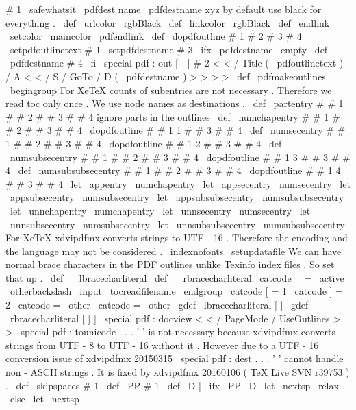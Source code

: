 {{{{
#
1
}
%
\
safewhatsit
{
\
pdfdest
name
{
\
pdfdestname
}
xyz
}
%
}
%
%
by
default
use
black
for
everything
.
\
def
\
urlcolor
{
\
rgbBlack
}
\
def
\
linkcolor
{
\
rgbBlack
}
\
def
\
endlink
{
\
setcolor
{
\
maincolor
}
\
pdfendlink
}
%
\
def
\
dopdfoutline
#
1
#
2
#
3
#
4
{
%
\
setpdfoutlinetext
{
#
1
}
\
setpdfdestname
{
#
3
}
\
ifx
\
pdfdestname
\
empty
\
def
\
pdfdestname
{
#
4
}
%
\
fi
%
\
special
{
pdf
:
out
[
-
]
#
2
<
<
/
Title
(
\
pdfoutlinetext
)
/
A
<
<
/
S
/
GoTo
/
D
(
\
pdfdestname
)
>
>
>
>
}
%
}
%
\
def
\
pdfmakeoutlines
{
%
\
begingroup
%
%
For
XeTeX
counts
of
subentries
are
not
necessary
.
%
Therefore
we
read
toc
only
once
.
%
%
We
use
node
names
as
destinations
.
\
def
\
partentry
#
#
1
#
#
2
#
#
3
#
#
4
{
}
%
ignore
parts
in
the
outlines
\
def
\
numchapentry
#
#
1
#
#
2
#
#
3
#
#
4
{
%
\
dopdfoutline
{
#
#
1
}
{
1
}
{
#
#
3
}
{
#
#
4
}
}
%
\
def
\
numsecentry
#
#
1
#
#
2
#
#
3
#
#
4
{
%
\
dopdfoutline
{
#
#
1
}
{
2
}
{
#
#
3
}
{
#
#
4
}
}
%
\
def
\
numsubsecentry
#
#
1
#
#
2
#
#
3
#
#
4
{
%
\
dopdfoutline
{
#
#
1
}
{
3
}
{
#
#
3
}
{
#
#
4
}
}
%
\
def
\
numsubsubsecentry
#
#
1
#
#
2
#
#
3
#
#
4
{
%
\
dopdfoutline
{
#
#
1
}
{
4
}
{
#
#
3
}
{
#
#
4
}
}
%
%
\
let
\
appentry
\
numchapentry
%
\
let
\
appsecentry
\
numsecentry
%
\
let
\
appsubsecentry
\
numsubsecentry
%
\
let
\
appsubsubsecentry
\
numsubsubsecentry
%
\
let
\
unnchapentry
\
numchapentry
%
\
let
\
unnsecentry
\
numsecentry
%
\
let
\
unnsubsecentry
\
numsubsecentry
%
\
let
\
unnsubsubsecentry
\
numsubsubsecentry
%
%
%
For
XeTeX
xdvipdfmx
converts
strings
to
UTF
-
16
.
%
Therefore
the
encoding
and
the
language
may
not
be
considered
.
%
\
indexnofonts
\
setupdatafile
%
We
can
have
normal
brace
characters
in
the
PDF
outlines
unlike
%
Texinfo
index
files
.
So
set
that
up
.
\
def
\
{
{
\
lbracecharliteral
}
%
\
def
\
}
{
\
rbracecharliteral
}
%
\
catcode
\
\
=
\
active
\
otherbackslash
\
input
\
tocreadfilename
\
endgroup
}
{
\
catcode
[
=
1
\
catcode
]
=
2
\
catcode
{
=
\
other
\
catcode
}
=
\
other
\
gdef
\
lbracecharliteral
[
{
]
%
\
gdef
\
rbracecharliteral
[
}
]
%
]
\
special
{
pdf
:
docview
<
<
/
PageMode
/
UseOutlines
>
>
}
%
\
special
{
pdf
:
tounicode
.
.
.
}
'
'
is
not
necessary
%
because
xdvipdfmx
converts
strings
from
UTF
-
8
to
UTF
-
16
without
it
.
%
However
due
to
a
UTF
-
16
conversion
issue
of
xdvipdfmx
20150315
%
\
special
{
pdf
:
dest
.
.
.
}
'
'
cannot
handle
non
-
ASCII
strings
.
%
It
is
fixed
by
xdvipdfmx
20160106
(
TeX
Live
SVN
r39753
)
.
%
\
def
\
skipspaces
#
1
{
\
def
\
PP
{
#
1
}
\
def
\
D
{
|
}
%
\
ifx
\
PP
\
D
\
let
\
nextsp
\
relax
\
else
\
let
\
nextsp
}}}}
